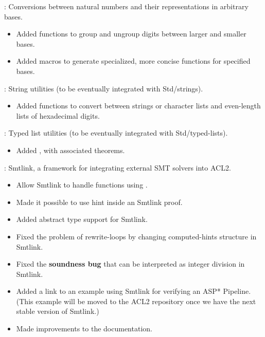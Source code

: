 \begin{frame}

\implibtitle

:
Conversions between natural numbers
and their representations in arbitrary bases.
\begin{itemize}
\item
Added functions to group and ungroup digits between larger and smaller bases.
\item
Added macros to generate specialized, more concise functions
for specified bases.
\end{itemize}

\separation

:
String utilities (to be eventually integrated with Std/strings).
\begin{itemize}
\item
Added functions to convert between strings or character lists
and even-length lists of hexadecimal digits.
\end{itemize}

\separation

:
Typed list utilities (to be eventually integrated with Std/typed-lists).
\begin{itemize}
\item
Added , with associated theorems.
\end{itemize}

\end{frame}


\begin{frame}

\implibtitle

:
Smtlink, a framework for integrating external SMT solvers into ACL2.
\begin{itemize}
\item
Allow Smtlink to handle functions using .
\item
Made it possible to use  hint inside an Smtlink proof.
\item
Added abstract type support for Smtlink.
\item
Fixed the problem of rewrite-loops by changing computed-hints structure in Smtlink.
\item
Fixed the {\color{red} \bf{soundness bug}} that  can be interpreted as integer division in Smtlink.
\item
Added a link to an example using Smtlink for verifying an ASP* Pipeline. (This example will be moved to the ACL2 repository once we have the next stable version of Smtlink.)
\item
Made improvements to the documentation.
\end{itemize}

\end{frame}

